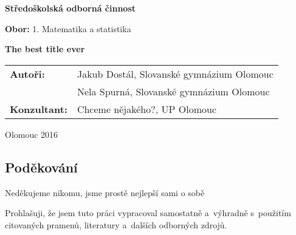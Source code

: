 \pagestyle{empty}
\begin{center}

\medskip

\vfill
{\bfseries\Large{Středoškolská odborná činnost}}

\medskip

{{\bfseries Obor: } 1. Matematika a statistika}
\vfill


\vspace{20mm}

{\LARGE\bfseries The best title ever}

\vfill

\begin{tabular}{ll}
\bfseries Autoři: & Jakub Dostál, Slovanské gymnázium Olomouc\\
                  & Nela Spurná,\hspace{0.153cm} Slovanské gymnázium Olomouc\\
\noalign{\vspace{2mm}}
\bfseries Konzultant: & Chceme nějakého?, UP Olomouc\\
\end{tabular}

\vfill
Olomouc 2016
\end{center}


\newpage
\openright

\noindent
\subsection*{Poděkování}
\noindent Neděkujeme nikomu, jsme prostě nejlepší sami o sobě



\newpage

\noindent
Prohlašuji, že jsem tuto práci vypracoval samostatně a~výhradně
s~použitím citovaných pramenů, literatury a~dalších odborných zdrojů.

